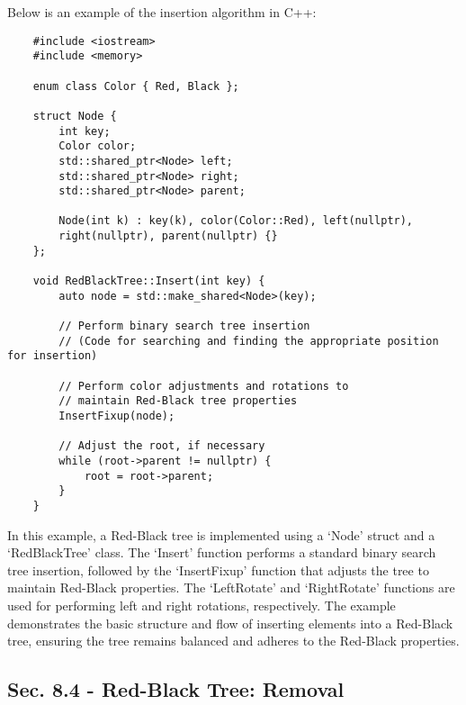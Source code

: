 \begin{solution}

    Below is an example of the insertion algorithm in C++:

    \horizontalline

    \begin{verbatim}
    #include <iostream>
    #include <memory>
    
    enum class Color { Red, Black };
    
    struct Node {
        int key;
        Color color;
        std::shared_ptr<Node> left;
        std::shared_ptr<Node> right;
        std::shared_ptr<Node> parent;
    
        Node(int k) : key(k), color(Color::Red), left(nullptr), 
        right(nullptr), parent(nullptr) {}
    };
    
    void RedBlackTree::Insert(int key) {
        auto node = std::make_shared<Node>(key);
    
        // Perform binary search tree insertion
        // (Code for searching and finding the appropriate position for insertion)
    
        // Perform color adjustments and rotations to 
        // maintain Red-Black tree properties
        InsertFixup(node);
    
        // Adjust the root, if necessary
        while (root->parent != nullptr) {
            root = root->parent;
        }
    }
    \end{verbatim}

    \horizontalline
    
    In this example, a Red-Black tree is implemented using a `Node' struct and a `RedBlackTree' class. The `Insert' function performs a standard binary search tree insertion, followed by the `InsertFixup' function that adjusts the tree to maintain Red-Black properties. The `LeftRotate' and `RightRotate' functions are used for performing 
    left and right rotations, respectively. The example demonstrates the basic structure and flow of inserting elements into a Red-Black tree, ensuring the tree remains balanced and adheres to the Red-Black properties.
\end{solution}

\subsection*{Sec. 8.4 - Red-Black Tree: Removal}

